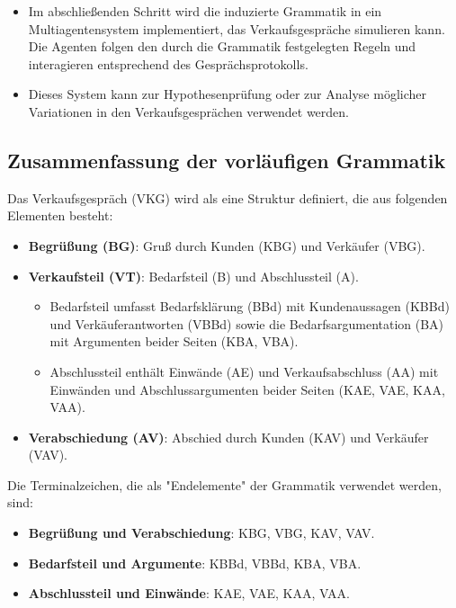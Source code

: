 \documentclass[
]{article}
\begin{document}
\begin{enumerate}
  \begin{itemize}
  \item
    Im abschließenden Schritt wird die induzierte Grammatik in ein Multiagentensystem implementiert, das Verkaufsgespräche simulieren kann. Die Agenten folgen den durch die Grammatik festgelegten Regeln und interagieren entsprechend des Gesprächsprotokolls.
  \item
    Dieses System kann zur Hypothesenprüfung oder zur Analyse möglicher Variationen in den Verkaufsgesprächen verwendet werden.
  \end{itemize}
\end{enumerate}

\subsection{Zusammenfassung der vorläufigen Grammatik}\label{zusammenfassung-der-vorlaeufigen-grammatik}

Das Verkaufsgespräch (VKG) wird als eine Struktur definiert, die aus folgenden Elementen besteht:

\begin{itemize}
\item
  \textbf{Begrüßung (BG)}: Gruß durch Kunden (KBG) und Verkäufer (VBG).
\item
  \textbf{Verkaufsteil (VT)}: Bedarfsteil (B) und Abschlussteil (A).

  \begin{itemize}
  \item
    Bedarfsteil umfasst Bedarfsklärung (BBd) mit Kundenaussagen (KBBd) und Verkäuferantworten (VBBd) sowie die Bedarfsargumentation (BA) mit Argumenten beider Seiten (KBA, VBA).
  \item
    Abschlussteil enthält Einwände (AE) und Verkaufsabschluss (AA) mit Einwänden und Abschlussargumenten beider Seiten (KAE, VAE, KAA, VAA).
  \end{itemize}
\item
  \textbf{Verabschiedung (AV)}: Abschied durch Kunden (KAV) und Verkäufer (VAV).
\end{itemize}

Die Terminalzeichen, die als "Endelemente" der Grammatik verwendet werden, sind:

\begin{itemize}
\item
  \textbf{Begrüßung und Verabschiedung}: KBG, VBG, KAV, VAV.
\item
  \textbf{Bedarfsteil und Argumente}: KBBd, VBBd, KBA, VBA.
\item
  \textbf{Abschlussteil und Einwände}: KAE, VAE, KAA, VAA.
\end{itemize}
\end{document}
